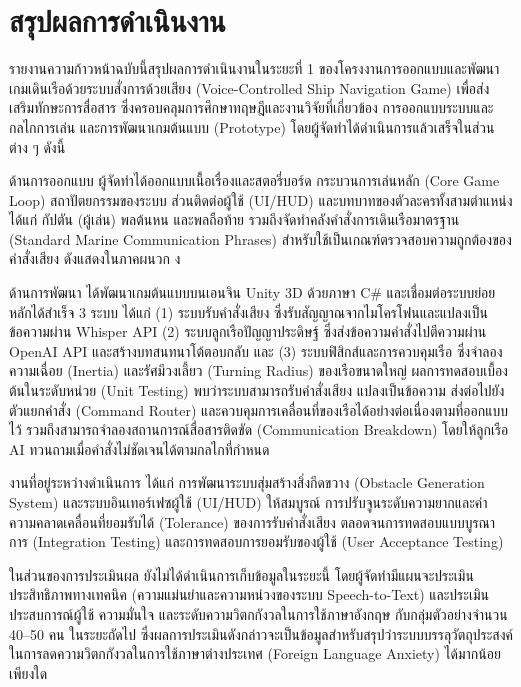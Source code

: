 
\section{สรุปผลการดำเนินงาน}

รายงานความก้าวหน้าฉบับนี้สรุปผลการดำเนินงานในระยะที่ 1 ของโครงงานการออกแบบและพัฒนาเกมเดินเรือด้วยระบบสั่งการด้วยเสียง (Voice-Controlled Ship Navigation Game) เพื่อส่งเสริมทักษะการสื่อสาร ซึ่งครอบคลุมการศึกษาทฤษฎีและงานวิจัยที่เกี่ยวข้อง การออกแบบระบบและกลไกการเล่น และการพัฒนาเกมต้นแบบ (Prototype) โดยผู้จัดทำได้ดำเนินการแล้วเสร็จในส่วนต่าง ๆ ดังนี้

ด้านการออกแบบ ผู้จัดทำได้ออกแบบเนื้อเรื่องและสตอรี่บอร์ด กระบวนการเล่นหลัก (Core Game Loop) สถาปัตยกรรมของระบบ ส่วนติดต่อผู้ใช้ (UI/HUD) และบทบาทของตัวละครทั้งสามตำแหน่ง ได้แก่ กัปตัน (ผู้เล่น) พลต้นหน และพลถือท้าย รวมถึงจัดทำคลังคำสั่งการเดินเรือมาตรฐาน (Standard Marine Communication Phrases) สำหรับใช้เป็นเกณฑ์ตรวจสอบความถูกต้องของคำสั่งเสียง ดังแสดงในภาคผนวก ง

ด้านการพัฒนา ได้พัฒนาเกมต้นแบบบนเอนจิน Unity 3D ด้วยภาษา C\# และเชื่อมต่อระบบย่อยหลักได้สำเร็จ 3 ระบบ ได้แก่ (1) ระบบรับคำสั่งเสียง ซึ่งรับสัญญาณจากไมโครโฟนและแปลงเป็นข้อความผ่าน Whisper API (2) ระบบลูกเรือปัญญาประดิษฐ์ ซึ่งส่งข้อความคำสั่งไปตีความผ่าน OpenAI API และสร้างบทสนทนาโต้ตอบกลับ และ (3) ระบบฟิสิกส์และการควบคุมเรือ ซึ่งจำลองความเฉื่อย (Inertia) และรัศมีวงเลี้ยว (Turning Radius) ของเรือขนาดใหญ่ ผลการทดสอบเบื้องต้นในระดับหน่วย (Unit Testing) พบว่าระบบสามารถรับคำสั่งเสียง แปลงเป็นข้อความ ส่งต่อไปยังตัวแยกคำสั่ง (Command Router) และควบคุมการเคลื่อนที่ของเรือได้อย่างต่อเนื่องตามที่ออกแบบไว้ รวมถึงสามารถจำลองสถานการณ์สื่อสารติดขัด (Communication Breakdown) โดยให้ลูกเรือ AI ทวนถามเมื่อคำสั่งไม่ชัดเจนได้ตามกลไกที่กำหนด

งานที่อยู่ระหว่างดำเนินการ ได้แก่ การพัฒนาระบบสุ่มสร้างสิ่งกีดขวาง (Obstacle Generation System) และระบบอินเทอร์เฟซผู้ใช้ (UI/HUD) ให้สมบูรณ์ การปรับจูนระดับความยากและค่าความคลาดเคลื่อนที่ยอมรับได้ (Tolerance) ของการรับคำสั่งเสียง ตลอดจนการทดสอบแบบบูรณาการ (Integration Testing) และการทดสอบการยอมรับของผู้ใช้ (User Acceptance Testing)

ในส่วนของการประเมินผล ยังไม่ได้ดำเนินการเก็บข้อมูลในระยะนี้ โดยผู้จัดทำมีแผนจะประเมินประสิทธิภาพทางเทคนิค (ความแม่นยำและความหน่วงของระบบ Speech-to-Text) และประเมินประสบการณ์ผู้ใช้ ความมั่นใจ และระดับความวิตกกังวลในการใช้ภาษาอังกฤษ กับกลุ่มตัวอย่างจำนวน 40–50 คน ในระยะถัดไป ซึ่งผลการประเมินดังกล่าวจะเป็นข้อมูลสำหรับสรุปว่าระบบบรรลุวัตถุประสงค์ในการลดความวิตกกังวลในการใช้ภาษาต่างประเทศ (Foreign Language Anxiety) ได้มากน้อยเพียงใด

